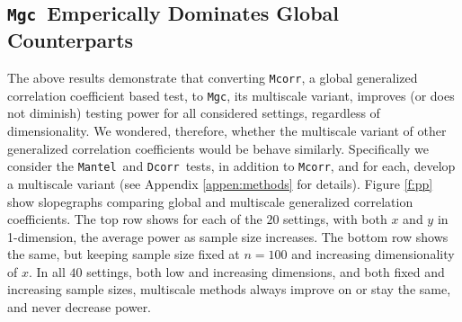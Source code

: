 \documentclass[11pt]{article}
\providecommand{\sct}[1]{{\sc \texttt{#1}}}
\newcommand{\Mgc}{\sct{Mgc}}
\newcommand{\Dcorr}{\sct{Dcorr}}
\newcommand{\Mcorr}{\sct{Mcorr}}
\newcommand{\Mantel}{\sct{Mantel}}
\begin{document}
\subsection*{\Mgc~Emperically Dominates Global Counterparts}

The above results demonstrate that converting \Mcorr, a global generalized correlation coefficient based test, to \Mgc, its multiscale variant, improves (or does not diminish) testing power for all considered settings, regardless of dimensionality.  We wondered, therefore, whether the multiscale variant of other generalized correlation coefficients would be behave similarly.  Specifically we consider the \Mantel~and \Dcorr~tests, in addition to \Mcorr, and for each, develop a multiscale variant (see Appendix \ref{appen:methods} for details). 
% 
Figure \ref{f:pp} show slopegraphs comparing global and multiscale generalized correlation coefficients.  The top row shows for each of the $20$ settings, with both $x$ and $y$ in 1-dimension, the average power as sample size increases.  The bottom row shows the same, but keeping sample size fixed at $n=100$ and increasing dimensionality of $x$.  In all $40$ settings, both low and increasing dimensions, and both fixed and increasing sample sizes, multiscale methods always improve on or stay the same, and never decrease power.  


\end{document}
